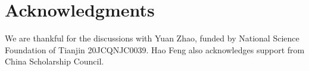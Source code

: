 \section*{Acknowledgments}
We are thankful for the discussions with Yuan Zhao, funded by National Science Foundation of Tianjin 20JCQNJC0039. Hao Feng also acknowledges support from China Scholarship Council.
